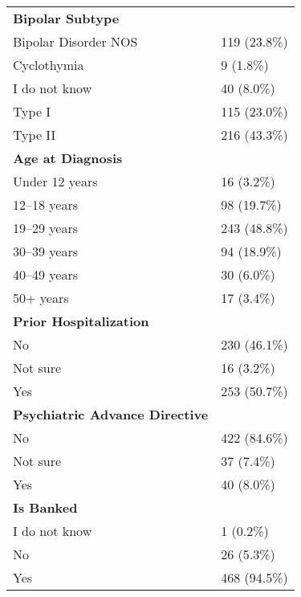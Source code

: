 \begin{longtable}{ll}
\textbf{Bipolar Subtype} & \\
\hspace{1em}Bipolar Disorder NOS & 119 (23.8\%) \\
\hspace{1em}Cyclothymia & 9 (1.8\%) \\
\hspace{1em}I do not know & 40 (8.0\%) \\
\hspace{1em}Type I & 115 (23.0\%) \\
\hspace{1em}Type II & 216 (43.3\%) \\

\textbf{Age at Diagnosis} & \\
\hspace{1em}Under 12 years & 16 (3.2\%) \\
\hspace{1em}12--18 years & 98 (19.7\%) \\
\hspace{1em}19--29 years & 243 (48.8\%) \\
\hspace{1em}30--39 years & 94 (18.9\%) \\
\hspace{1em}40--49 years & 30 (6.0\%) \\
\hspace{1em}50+ years & 17 (3.4\%) \\

\textbf{Prior Hospitalization} & \\
\hspace{1em}No & 230 (46.1\%) \\
\hspace{1em}Not sure & 16 (3.2\%) \\
\hspace{1em}Yes & 253 (50.7\%) \\

\textbf{Psychiatric Advance Directive} & \\
\hspace{1em}No & 422 (84.6\%) \\
\hspace{1em}Not sure & 37 (7.4\%) \\
\hspace{1em}Yes & 40 (8.0\%) \\

\textbf{Is Banked} & \\
\hspace{1em}I do not know & 1 (0.2\%) \\
\hspace{1em}No & 26 (5.3\%) \\
\hspace{1em}Yes & 468 (94.5\%) \\


\end{longtable}
